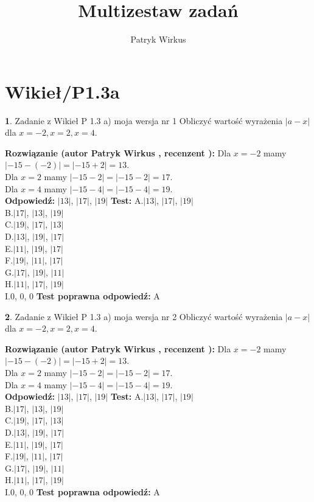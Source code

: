 \documentclass[12pt, a4paper]{article}
\title{Multizestaw zadań}
\author{Patryk Wirkus}
\date{}
\theoremstyle{definition} %
\newtheorem{zad}{}
\newcommand{\kategoria}[1]{\section{#1}}
\newcommand{\zadStart}[1]{\begin{zad}#1\newline}
\newcommand{\zadStop}{\end{zad}}
\newcommand{\rozwStart}[2]{\noindent \textbf{Rozwiązanie (autor #1 , recenzent #2): }\newline}
\newcommand{\rozwStop}{\newline}
\newcommand{\odpStart}{\noindent \textbf{Odpowiedź:}\newline}
\newcommand{\odpStop}{\newline}
\newcommand{\testStart}{\noindent \textbf{Test:}\newline}
\newcommand{\testStop}{\newline}
\newcommand{\kluczStart}{\noindent \textbf{Test poprawna odpowiedź:}\newline}
\newcommand{\kluczStop}{\newline}
\begin{document}
\maketitle

\kategoria{Wikieł/P1.3a}


\zadStart{Zadanie z Wikieł P 1.3 a) moja wersja nr 1}
Obliczyć wartość wyrażenia $|a - x|$ dla $x=-2,x=2,x=4$.
\zadStop
\rozwStart{Patryk Wirkus}{}
Dla $x = -2$ mamy $|-15 - (-2)| = |-15 + 2| = 13$.\\
Dla $x = 2$ mamy $|-15 - 2| = |-15 - 2| = 17$.\\
Dla $x = 4$ mamy $|-15 - 4| = |-15 - 4| = 19$.\\
\rozwStop
\odpStart
$|13|$, $|17|$, $|19|$
\odpStop
\testStart
A.$|13|$, $|17|$, $|19|$\\
B.$|17|$, $|13|$, $|19|$\\
C.$|19|$, $|17|$, $|13|$\\
D.$|13|$, $|19|$, $|17|$\\
E.$|11|$, $|19|$, $|17|$\\
F.$|19|$, $|11|$, $|17|$\\
G.$|17|$, $|19|$, $|11|$\\
H.$|11|$, $|17|$, $|19|$\\
I.$0$, $0$, $0$
\testStop
\kluczStart
A
\kluczStop



\zadStart{Zadanie z Wikieł P 1.3 a) moja wersja nr 2}
Obliczyć wartość wyrażenia $|a - x|$ dla $x=-2,x=2,x=4$.
\zadStop
\rozwStart{Patryk Wirkus}{}
Dla $x = -2$ mamy $|-15 - (-2)| = |-15 + 2| = 13$.\\
Dla $x = 2$ mamy $|-15 - 2| = |-15 - 2| = 17$.\\
Dla $x = 4$ mamy $|-15 - 4| = |-15 - 4| = 19$.\\
\rozwStop
\odpStart
$|13|$, $|17|$, $|19|$
\odpStop
\testStart
A.$|13|$, $|17|$, $|19|$\\
B.$|17|$, $|13|$, $|19|$\\
C.$|19|$, $|17|$, $|13|$\\
D.$|13|$, $|19|$, $|17|$\\
E.$|11|$, $|19|$, $|17|$\\
F.$|19|$, $|11|$, $|17|$\\
G.$|17|$, $|19|$, $|11|$\\
H.$|11|$, $|17|$, $|19|$\\
I.$0$, $0$, $0$
\testStop
\kluczStart
A
\kluczStop
\end{document}
